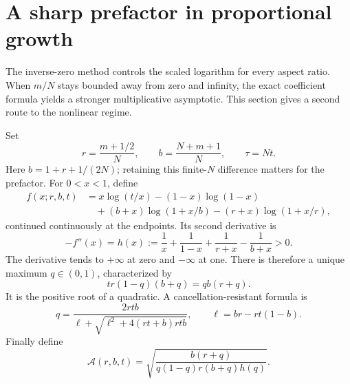 \documentclass[11pt,a4paper]{article}
\numberwithin{equation}{section}
\theoremstyle{definition}
\theoremstyle{remark}
\begin{document}
\section{A sharp prefactor in proportional growth}
\label{gs:sec:saddle}

The inverse-zero method controls the scaled logarithm for every aspect
ratio. When $m/N$ stays bounded away from zero and infinity, the exact
coefficient formula yields a stronger multiplicative asymptotic.
This section gives a second route to the nonlinear regime.

Set
\begin{equation}\label{gs:eq:saddle-params}
 r=\frac{m+1/2}{N},\qquad b=\frac{N+m+1}{N},\qquad \tau=Nt.
\end{equation}
Here $b=1+r+1/(2N)$; retaining this finite-$N$ difference matters for the
prefactor. For $0<x<1$, define
\begin{align}\label{gs:eq:f}
 f(x;r,b,t)
 &=x\log(t/x)-(1-x)\log(1-x)\nonumber\\
 &\quad +(b+x)\log(1+x/b)-(r+x)\log(1+x/r),
\end{align}
continued continuously at the endpoints. Its second derivative is
\begin{equation}\label{gs:eq:h}
 -f''(x)=h(x):=\frac1x+\frac1{1-x}
                    +\frac1{r+x}-\frac1{b+x}>0.
\end{equation}
The derivative tends to $+\infty$ at zero and $-\infty$ at one.
There is therefore a unique maximum $q\in(0,1)$, characterized by
\begin{equation}\label{gs:eq:q}
 tr(1-q)(b+q)=qb(r+q).
\end{equation}
It is the positive root of a quadratic. A cancellation-resistant formula is
\begin{equation}\label{gs:eq:q-stable}
 q=\frac{2rtb}{\ell+\sqrt{\ell^2+4(rt+b)rtb}},\qquad
 \ell=br-rt(1-b).
\end{equation}
Finally define
\begin{equation}\label{gs:eq:prefactor}
 \mathcal A(r,b,t)=
 \sqrt{\frac{b(r+q)}{q(1-q)r(b+q)h(q)}}.
\end{equation}
\end{document}

